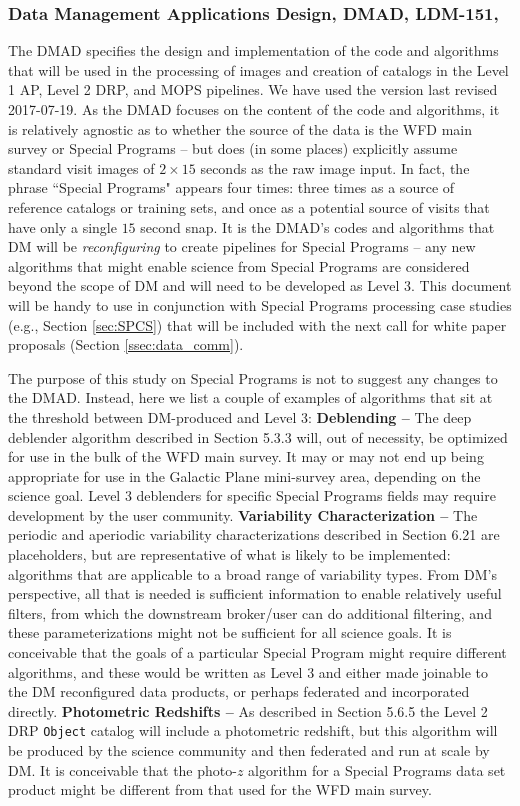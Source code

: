 \documentclass[DM,lsstdraft,toc]{lsstdoc}
\begin{document}
\subsubsection{Data Management Applications Design, DMAD, LDM-151, \cite{LDM-151}}\label{sssec:dmplans_review_dmad}

The DMAD specifies the design and implementation of the code and algorithms that will be used in the processing of images and creation of catalogs in the Level 1 AP, Level 2 DRP, and MOPS pipelines. We have used the version last revised 2017-07-19. As the DMAD focuses on the content of the code and algorithms, it is relatively agnostic as to whether the source of the data is the WFD main survey or Special Programs -- but does (in some places) explicitly assume standard visit images of $2\times15$ seconds as the raw image input. In fact, the phrase ``Special Programs" appears four times: three times as a source of reference catalogs or training sets, and once as a potential source of visits that have only a single $15$ second snap. It is the DMAD's codes and algorithms that DM will be {\it reconfiguring} to create pipelines for Special Programs -- any new algorithms that might enable science from Special Programs are considered beyond the scope of DM and will need to be developed as Level 3. This document will be handy to use in conjunction with Special Programs processing case studies (e.g., Section \ref{sec:SPCS}) that will be included with the next call for white paper proposals (Section \ref{ssec:data_comm}). 

The purpose of this study on Special Programs is not to suggest any changes to the DMAD. Instead, here we list a couple of examples of algorithms that sit at the threshold between DM-produced and Level 3: {\bf Deblending --} The deep deblender algorithm described in Section 5.3.3 will, out of necessity, be optimized for use in the bulk of the WFD main survey. It may or may not end up being appropriate for use in the Galactic Plane mini-survey area, depending on the science goal. Level 3 deblenders for specific Special Programs fields may require development by the user community. {\bf Variability Characterization --} The periodic and aperiodic variability characterizations described in Section 6.21 are placeholders, but are representative of what is likely to be implemented: algorithms that are applicable to a broad range of variability types. From DM's perspective, all that is needed is sufficient information to enable relatively useful filters, from which the downstream broker/user can do additional filtering, and these parameterizations might not be sufficient for all science goals. It is conceivable that the goals of a particular Special Program might require different algorithms, and these would be written as Level 3 and either made joinable to the DM reconfigured data products, or perhaps federated and incorporated directly. {\bf Photometric Redshifts --} As described in Section 5.6.5 the Level 2 DRP {\tt Object} catalog will include a photometric redshift, but this algorithm will be produced by the science community and then federated and run at scale by DM. It is conceivable that the photo-$z$ algorithm for a Special Programs data set product might be different from that used for the WFD main survey. 
\end{document}
